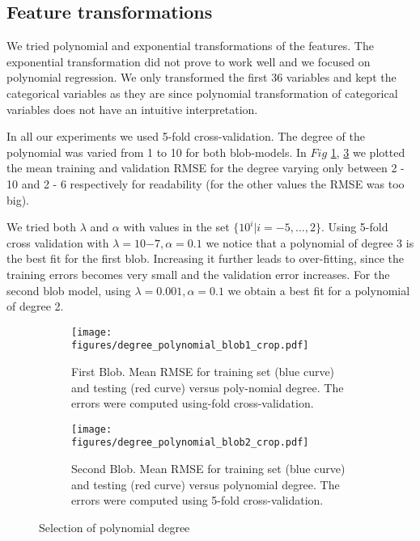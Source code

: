 \subsection{Feature transformations}
We tried polynomial and exponential transformations of the features.
The exponential transformation did not prove to work well and we focused on polynomial regression.
We only transformed the first 36 variables and kept the categorical variables as they are since polynomial transformation of categorical variables does not have an intuitive interpretation. 

In all our experiments we used 5-fold cross-validation. The degree of the polynomial was varied from 1 to 10 for both blob-models. In $Fig$ \ref{fig:degree_blob1}, \ref{fig:degre_blob2} we plotted the mean training and validation RMSE for the degree varying only between 2 - 10 and 2 - 6 respectively for readability (for the other values the RMSE was too big). 

We tried both $\lambda$ and $\alpha$ with values in the set $\{10^i | i =-5,...,2\}$.
Using 5-fold cross validation with $\lambda = 10{-7}, \alpha = 0.1$ we
notice that a polynomial of degree 3 is the best fit for the first blob. Increasing it further leads to over-fitting, since the training errors becomes very small and the validation error increases. For the second blob model, using  $\lambda = 0.001, \alpha = 0.1$ we obtain a best fit for a polynomial of degree 2.

\begin{figure}[h]
  \centering
  \begin{subfigure}[b]{0.45\textwidth}
   \texttt{[image: figures/degree\_polynomial\_blob1\_crop.pdf]}
    \caption{First Blob. Mean RMSE for training set \newline (blue curve) and testing (red curve) versus poly-\newline nomial degree. The errors were computed using-fold cross-validation.}
    \label{fig:degree_blob1}
  \end{subfigure}
  \begin{subfigure}[b]{0.45\textwidth}
    \texttt{[image: figures/degree\_polynomial\_blob2\_crop.pdf]}
    \caption{Second Blob. Mean RMSE for training set (blue curve) and testing (red curve) versus polynomial degree. The errors were computed using 5-fold cross-validation.}
    \label{fig:degre_blob2}
  \end{subfigure}
  \caption{Selection of polynomial degree}
\end{figure}

